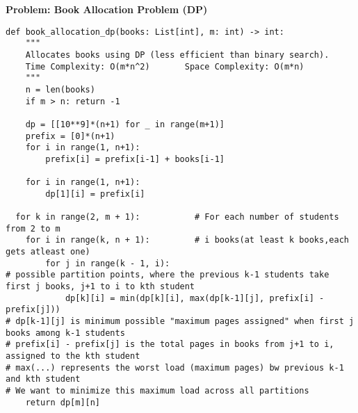 \noindent\textbf{Problem: Book Allocation Problem (DP)}
\begin{verbatim}
def book_allocation_dp(books: List[int], m: int) -> int:
    """
    Allocates books using DP (less efficient than binary search).
    Time Complexity: O(m*n^2)       Space Complexity: O(m*n)
    """
    n = len(books)
    if m > n: return -1
    
    dp = [[10**9]*(n+1) for _ in range(m+1)]
    prefix = [0]*(n+1)
    for i in range(1, n+1):
        prefix[i] = prefix[i-1] + books[i-1]
    
    for i in range(1, n+1):
        dp[1][i] = prefix[i]
    
  for k in range(2, m + 1):           # For each number of students from 2 to m
    for i in range(k, n + 1):         # i books(at least k books,each gets atleast one)
        for j in range(k - 1, i):      
# possible partition points, where the previous k-1 students take first j books, j+1 to i to kth student
            dp[k][i] = min(dp[k][i], max(dp[k-1][j], prefix[i] - prefix[j]))
# dp[k-1][j] is minimum possible "maximum pages assigned" when first j books among k-1 students
# prefix[i] - prefix[j] is the total pages in books from j+1 to i, assigned to the kth student
# max(...) represents the worst load (maximum pages) bw previous k-1  and kth student
# We want to minimize this maximum load across all partitions
    return dp[m][n]
\end{verbatim}
% 
